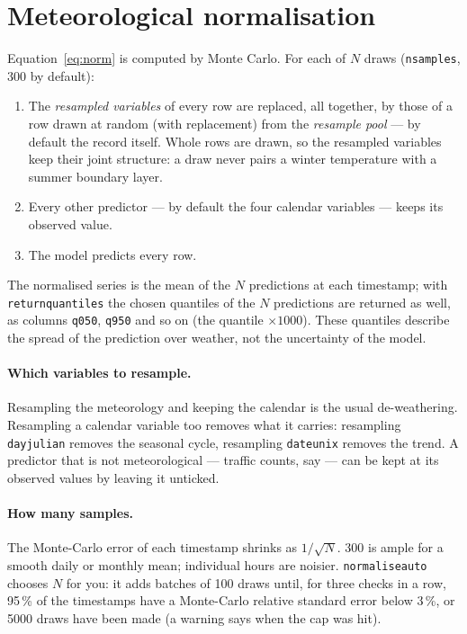\documentclass[11pt]{report}
\newcommand{\nosep}{\setlength{\itemsep}{0pt}\setlength{\parskip}{0pt}\setlength{\topsep}{2pt}}
\newcommand{\codeunderscore}{\textunderscore\allowbreak}
\newcommand{\code}[1]{\texttt{\let\_\codeunderscore #1}}
\begin{document}
\section{Meteorological normalisation}\label{sec:normalise}
Equation~\eqref{eq:norm} is computed by Monte Carlo. For each of $N$ draws
(\code{n\_samples}, 300 by default):
\begin{enumerate}\nosep
  \item The \emph{resampled variables} of every row are replaced, all together, by those
        of a row drawn at random (with replacement) from the \emph{resample pool} ---
        by default the record itself. Whole rows are drawn, so the resampled variables
        keep their joint structure: a draw never pairs a winter temperature with a
        summer boundary layer.
  \item Every other predictor --- by default the four calendar variables --- keeps its
        observed value.
  \item The model predicts every row.
\end{enumerate}
The normalised series is the mean of the $N$ predictions at each timestamp; with
\code{return\_quantiles} the chosen quantiles of the $N$ predictions are returned as
well, as columns \code{q050}, \code{q950} and so on (the quantile $\times 1000$). These
quantiles describe the spread of the prediction over weather, not the uncertainty of the
model.

\paragraph{Which variables to resample.} Resampling the meteorology and keeping the
calendar is the usual de-weathering. Resampling a calendar variable too removes what it
carries: resampling \code{day\_julian} removes the seasonal cycle, resampling
\code{date\_unix} removes the trend. A predictor that is not meteorological --- traffic
counts, say --- can be kept at its observed values by leaving it unticked.

\paragraph{How many samples.} The Monte-Carlo error of each timestamp shrinks as
$1/\sqrt{N}$. 300 is ample for a smooth daily or monthly mean; individual hours are
noisier. \code{normalise\_auto} chooses $N$ for you: it adds batches of 100 draws until,
for three checks in a row, 95\,\% of the timestamps have a Monte-Carlo relative standard
error below 3\,\%, or 5000 draws have been made (a warning says when the cap was hit).
\end{document}
